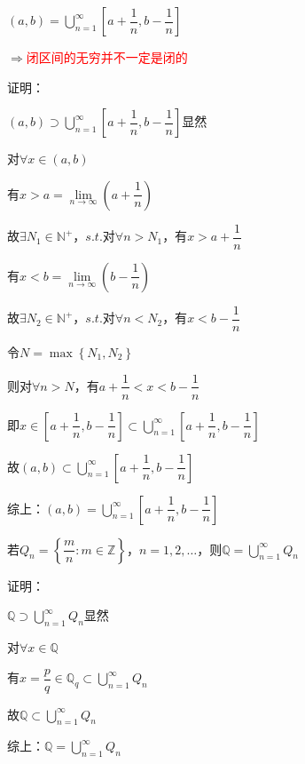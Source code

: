 
\begin{eg} 
$\left(a,b\right) = \bigcup \limits_{n=1}^{\infty}\left[ a + \dfrac{1}{n},b - \dfrac{1}{n}\right]$
\par $\Rightarrow$\textcolor{red}{闭区间的无穷并不一定是闭的}
\end{eg}
\noindent 证明：
\par {} $\left(a,b\right) \supset \bigcup \limits_{n=1}^{\infty}\left[ a + \dfrac{1}{n},b - \dfrac{1}{n}\right]$显然
\par {} 对$\forall x \in \left(a,b\right) $
\par \quad 有$ x > a = \lim \limits_{n \to \infty} \left( a + \dfrac{1}{n}\right)$
\par \quad 故$ \exists N_{1} \in \mathbb{N}^{+}$，$s.t.$对$\forall n > N_{1}$，有$x > a + \dfrac{1}{n}$
\par \quad 有$ x < b = \lim \limits_{n \to \infty} \left( b - \dfrac{1}{n}\right)$
\par \quad 故$ \exists N_{2} \in \mathbb{N}^{+}$，$s.t.$对$\forall n < N_{2}$，有$x < b - \dfrac{1}{n}$
\par \quad 令$N = \max \left\{N_{1},N_{2}\right\} $
\par \quad 则对$\forall n > N$，有$a + \dfrac{1}{n} < x < b - \dfrac{1}{n}$
\par \quad 即$x \in \left[ a + \dfrac{1}{n},b - \dfrac{1}{n}\right] \subset \bigcup \limits_{n=1}^{\infty}\left[ a + \dfrac{1}{n},b - \dfrac{1}{n}\right]$
\par \quad 故$ \left(a,b\right) \subset \bigcup \limits_{n=1}^{\infty}\left[ a + \dfrac{1}{n},b - \dfrac{1}{n}\right]$
\par 综上：$\left(a,b\right) = \bigcup \limits_{n=1}^{\infty}\left[ a + \dfrac{1}{n},b - \dfrac{1}{n}\right]$

\begin{eg}
    若$Q_{n} = \left\{\dfrac{m}{n} : m \in \mathbb{Z}\right\} $，$n = 1,2,\dots$，则$\mathbb{Q} = \bigcup \limits_{n=1}^{\infty} Q_{n}$
\end{eg}
\noindent 证明：
\par {} $\mathbb{Q} \supset \bigcup \limits_{n=1}^{\infty} Q_{n}$显然
\par {} 对$\forall x \in \mathbb{Q}$
\par \quad 有$x = \dfrac{p}{q} \in \mathbb{Q}_{q} \subset \bigcup \limits_{n=1}^{\infty} Q_{n}$
\par \quad 故$ \mathbb{Q} \subset \bigcup \limits_{n=1}^{\infty} Q_{n}$
\par 综上：$\mathbb{Q} = \bigcup \limits_{n=1}^{\infty} Q_{n}$

